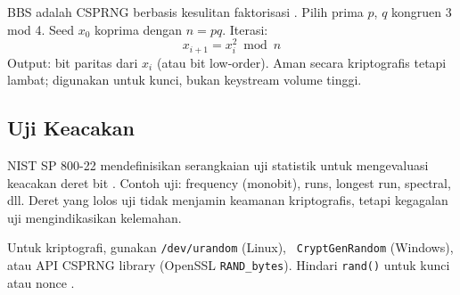 BBS adalah CSPRNG berbasis kesulitan faktorisasi \cite{menezes1996}. Pilih prima $p$, $q$ kongruen 3 mod 4. Seed $x_0$ koprima dengan $n = pq$. Iterasi:
\[
x_{i+1} = x_i^2 \bmod n
\]
Output: bit paritas dari $x_i$ (atau bit low-order). Aman secara kriptografis tetapi lambat; digunakan untuk kunci, bukan keystream volume tinggi.

\subsection{Uji Keacakan}

NIST SP 800-22 mendefinisikan serangkaian uji statistik untuk mengevaluasi keacakan deret bit \cite{stallings2017}. Contoh uji: frequency (monobit), runs, longest run, spectral, dll. Deret yang lolos uji tidak menjamin keamanan kriptografis, tetapi kegagalan uji mengindikasikan kelemahan.

\begin{catatan}
Untuk kriptografi, gunakan \texttt{/dev/urandom} (Linux), \texttt{ CryptGenRandom} (Windows), atau API CSPRNG library (OpenSSL \texttt{RAND\_bytes}). Hindari \texttt{rand()} untuk kunci atau nonce \cite{ferguson2010}.
\end{catatan}
